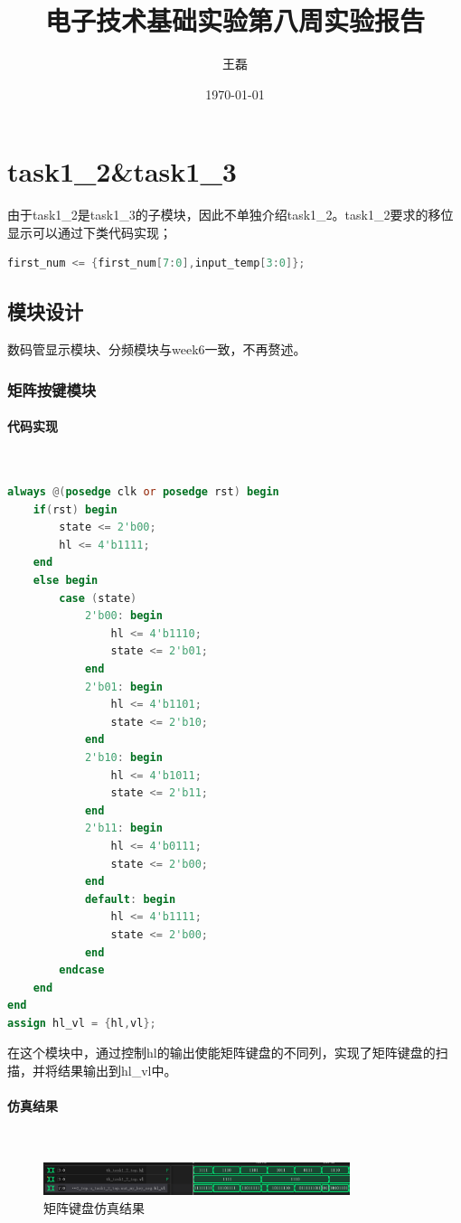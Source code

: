 \documentclass[UTF8]{ctexart}
\title{电子技术基础实验第八周实验报告}
\author{王磊\quad2022012972}
\date{\today}
\newcommand{\subsubsubsection}[1]{\paragraph{#1}\mbox{}\\}
\begin{document}
\maketitle
\section{task1\_2\&task1\_3}
由于task1\_2是task1\_3的子模块，因此不单独介绍task1\_2。task1\_2要求的移位显示可以通过下类代码实现；
\begin{framed}
	\begin{lstlisting}[language=verilog,style=verilogStyle]
        first_num <= {first_num[7:0],input_temp[3:0]};
    \end{lstlisting}
\end{framed}
\subsection{模块设计}
数码管显示模块、分频模块与week6一致，不再赘述。
\subsubsection{矩阵按键模块}
\subsubsubsection{代码实现}
\begin{framed}
	\begin{lstlisting}[language=verilog,style=verilogStyle]
always @(posedge clk or posedge rst) begin
    if(rst) begin
        state <= 2'b00; 
		hl <= 4'b1111;
    end
    else begin
        case (state)
            2'b00: begin
				hl <= 4'b1110;
                state <= 2'b01;
            end
            2'b01: begin
				hl <= 4'b1101;
                state <= 2'b10;
            end
            2'b10: begin
				hl <= 4'b1011;
                state <= 2'b11;
            end
            2'b11: begin
				hl <= 4'b0111;
                state <= 2'b00;
            end
            default: begin
				hl <= 4'b1111;
                state <= 2'b00;
            end
        endcase
    end
end 
assign hl_vl = {hl,vl};  
    \end{lstlisting}
\end{framed}
在这个模块中，通过控制hl的输出使能矩阵键盘的不同列，实现了矩阵键盘的扫描，并将结果输出到hl\_vl中。
\subsubsubsection{仿真结果}
\begin{figure}[H]
	\centering
	\includegraphics[width=0.8\textwidth]{task1_3_1.png}
	\caption{矩阵键盘仿真结果}
\end{figure}
\end{document}
